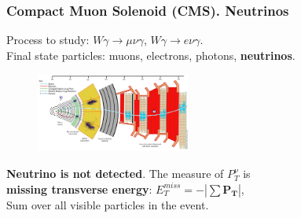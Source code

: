 \begin{frame}\frametitle{Compact Muon Solenoid (CMS). Neutrinos}
\scriptsize
Process to study: $W\gamma\rightarrow\mu\nu\gamma$, $W\gamma\rightarrow e\nu\gamma$.\\
Final state particles: muons, electrons, photons, {\color{blue}\bfseries{neutrinos}}.\\
\begin{figure}[htb]
  \begin{center}
    {\includegraphics[width=0.45\textwidth]{../figs/Exp/CMS_Slice.png}}
  \end{center}
\end{figure}

\scriptsize
{\color{blue}\bfseries{Neutrino is not detected}}. The measure of $P_T^{\nu}$ is\\ 
{\bfseries{missing transverse energy}}: $  E_T^{miss} = - | \sum \mathbf{P_T} |$,\\
Sum over all visible particles in the event. 

\end{frame}%


